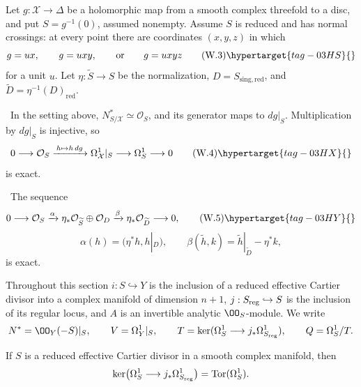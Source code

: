
Let $g:\mathcal X\to\Delta$ be a holomorphic map from a smooth complex
threefold to a disc, and put $S=g^{-1}(0)$, assumed nonempty.  Assume $S$ is reduced and has
normal crossings: at every point there are coordinates $(x,y,z)$ in which
\[
g=ux,\qquad g=uxy,\qquad\text{or}\qquad g=uxyz
\tag{W.3}\hypertarget{tag-03HS}{}\label{wbII:eq:W:5.3}
\]
for a unit $u$.  Let $\eta:\widetilde S\to S$ be the normalization,
$D=S_{\mathrm{sing,red}}$, and $\widetilde D=\eta^{-1}(D)_{\mathrm{red}}$.



\ In the setting above, $N^*_{S/\mathcal X}\simeq\mathcal O_S$,
and its generator maps to $dg|_S$.  Multiplication by $dg|_S$ is injective,
so
\[
0\longrightarrow\mathcal O_S
\xrightarrow{\,h\mapsto h\,dg\,}
\Omega^1_{\mathcal X}|_S\longrightarrow\Omega^1_S\longrightarrow0
\tag{W.4}\hypertarget{tag-03HX}{}\label{wbII:eq:W:5.4}
\]
is exact.





\ The sequence
\[
0\longrightarrow\mathcal O_S
\xrightarrow{\alpha}
\eta_*\mathcal O_{\widetilde S}\oplus\mathcal O_D
\xrightarrow{\beta}
\eta_*\mathcal O_{\widetilde D}
\longrightarrow0,
\tag{W.5}\hypertarget{tag-03HY}{}\label{wbII:eq:W:5.5}
\]
\[
\alpha(h)=(\eta^*h,h|_D),\qquad
\beta(\widetilde h,k)=
\widetilde h|_{\widetilde D}-\eta^*k,
\]
is exact.





Throughout this section $i:S\hookrightarrow Y$ is the inclusion of a reduced effective Cartier divisor into a complex manifold of dimension $n+1$, $j:S_{\rm reg}\hookrightarrow S$ is the inclusion of its regular locus, and $A$ is an invertible analytic $\OO_S$-module. We write
\[
 N^*=\OO_Y(-S)|_S,\qquad V=\Omega_Y^1|_S,\qquad
 T=\ker(\Omega_S^1\longrightarrow j_*\Omega^1_{S_{\rm reg}}),\qquad Q=\Omega_S^1/T.
\]


If $S$ is a reduced effective Cartier divisor in a smooth complex manifold,
then
\[
\ker\bigl(\Omega^1_S\longrightarrow j_*\Omega^1_{S_{\rm reg}}\bigr)
  =\operatorname{Tor}(\Omega^1_S).
\]
